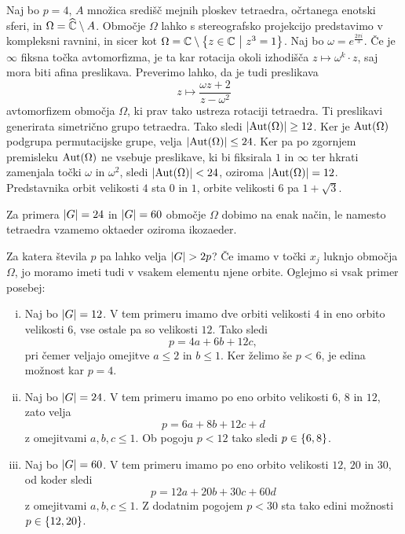\begin{zgled}
Naj bo $p = 4$, $A$ množica središč mejnih ploskev tetraedra,
očrtanega enotski sferi, in $\Omega = \widehat{\mathbb{C}} \setminus A$. Območje
$\Omega$ lahko s stereografsko projekcijo predstavimo v kompleksni
ravnini, in sicer kot
$\Omega = \mathbb{C} \setminus \left\{z \in \mathbb{C}~\middle\vert~z^3 = 1\right\}$. Naj bo
$\omega = e^{\frac{2 \pi i}{3}}$. Če je $\infty$ fiksna točka
avtomorfizma, je ta kar rotacija okoli izhodišča
$z \mapsto \omega^k \cdot z$, saj mora biti afina preslikava.
Preverimo lahko, da je tudi preslikava
\[
z \mapsto \frac{\omega z + 2}{z - \omega^2}
\]
avtomorfizem območja $\Omega$, ki prav tako ustreza rotaciji
tetraedra. Ti preslikavi generirata simetrično grupo tetraedra.
Tako sledi $\left\lvert \operatorname{Aut}(\Omega)\right\rvert \geq 12$. Ker je $\operatorname{Aut}(\Omega)$
podgrupa permutacijske grupe, velja $\left\lvert \operatorname{Aut}(\Omega)\right\rvert \leq 24$.
Ker pa po zgornjem premisleku $\operatorname{Aut}(\Omega)$ ne vsebuje preslikave,
ki bi fiksirala $1$ in $\infty$ ter hkrati zamenjala točki $\omega$
in $\omega^2$, sledi $\left\lvert \operatorname{Aut}(\Omega)\right\rvert < 24$, oziroma
$\left\lvert \operatorname{Aut}(\Omega)\right\rvert = 12$. Predstavnika orbit velikosti $4$ sta $0$
in $1$, orbite velikosti $6$ pa $1 + \sqrt{3}$.
\end{zgled}

Za primera $\left\lvert G\right\rvert = 24$ in $\left\lvert G\right\rvert = 60$ območje $\Omega$ dobimo
na enak način, le namesto tetraedra vzamemo oktaeder oziroma
ikozaeder.

Za katera števila $p$ pa lahko velja $\left\lvert G\right\rvert > 2p$? Če imamo v
točki $x_j$ luknjo območja $\Omega$, jo moramo imeti tudi v vsakem
elementu njene orbite. Oglejmo si vsak primer posebej:

\begin{enumerate}[i)]
\item Naj bo $\left\lvert G\right\rvert = 12$. V tem primeru imamo dve orbiti
velikosti $4$ in eno orbito velikosti $6$, vse ostale pa so
velikosti $12$. Tako sledi
\[
p = 4a + 6b + 12c,
\]
pri čemer veljajo omejitve $a \leq 2$ in $b \leq 1$. Ker želimo še
$p < 6$, je edina možnost kar $p = 4$.

\item Naj bo $\left\lvert G\right\rvert = 24$. V tem primeru imamo po eno orbito
velikosti $6$, $8$ in $12$, zato velja
\[
p = 6a + 8b + 12c + d
\]
z omejitvami $a, b, c \leq 1$. Ob pogoju $p < 12$ tako sledi
$p \in \left\{6, 8\right\}$.

\item Naj bo $\left\lvert G\right\rvert = 60$. V tem primeru imamo po eno orbito
velikosti $12$, $20$ in $30$, od koder sledi
\[
p = 12a + 20b + 30c + 60d
\]
z omejitvami $a, b, c \leq 1$. Z dodatnim pogojem $p < 30$ sta tako
edini možnosti $p \in \left\{12, 20\right\}$.
\end{enumerate}

